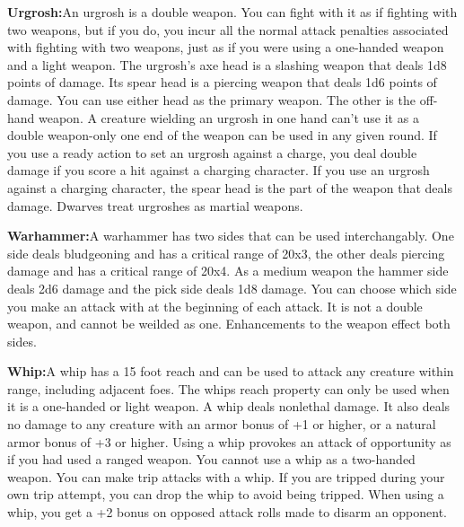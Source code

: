 \noindent\textbf{Urgrosh:}{An urgrosh is a double weapon. You can fight with it as if fighting with two weapons, but if you do, you incur all the normal attack penalties associated with fighting with two weapons, just as if you were using a one-handed weapon and a light weapon. The urgrosh’s axe head is a slashing weapon that deals 1d8 points of damage. Its spear head is a piercing weapon that deals 1d6 points of damage. You can use either head as the primary weapon. The other is the off-hand weapon. A creature wielding an urgrosh in one hand can’t use it as a double weapon-only one end of the weapon can be used in any given round. If you use a ready action to set an urgrosh against a charge, you deal double damage if you score a hit against a charging character. If you use an urgrosh against a charging character, the spear head is the part of the weapon that deals damage. Dwarves treat urgroshes as martial weapons.}

\noindent\textbf{Warhammer:}{A warhammer has two sides that can be used interchangably. One side deals bludgeoning and has a critical range of 20x3, the other deals piercing damage and has a critical range of 20x4. As a medium weapon the hammer side deals 2d6 damage and the pick side deals 1d8 damage. You can choose which side you make an attack with at the beginning of each attack. It is not a double weapon, and cannot be weilded as one. Enhancements to the weapon effect both sides.}

\noindent\textbf{Whip:}{A whip has a 15 foot reach and can be used to attack any creature within range, including adjacent foes. The whips reach property can only be used when it is a one-handed or light weapon. A whip deals nonlethal damage. It also deals no damage to any creature with an armor bonus of +1 or higher, or a natural armor bonus of +3 or higher. Using a whip provokes an attack of opportunity as if you had used a ranged weapon. You cannot use a whip as a two-handed weapon. You can make trip attacks with a whip. If you are tripped during your own trip attempt, you can drop the whip to avoid being tripped. When using a whip, you get a +2 bonus on opposed attack rolls made to disarm an opponent.}